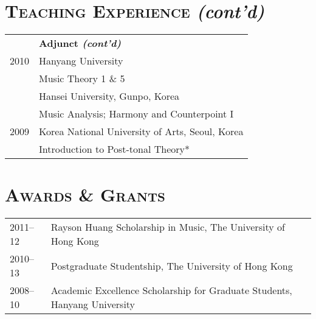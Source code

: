 \documentclass[letter,11pt,draft]{article}
\begin{document}
  \section*{\textsc{Teaching Experience} \textit{(cont'd)}}
  \hspace*{-0.25cm}
  \begin{tabular}{p{2.5cm} l}
    & \textbf{Adjunct \textit{(cont'd)}}\\
    2010 & Hanyang University\\
    & Music Theory 1 \& 5\\[1mm]
    
    & Hansei University, Gunpo, Korea\\
    & Music Analysis; Harmony and Counterpoint I\\[1mm]
    
    2009 & Korea National University of Arts, Seoul, Korea\\
    & Introduction to Post-tonal Theory*
  \end{tabular}
  
  \vspace{5mm}
  
%  
%  
  
  \section*{\textsc{Awards \& Grants}}
  
  \hspace*{-0.25cm}
  \begin{tabular}{p{2.5cm} l}
    
    2011–12 & Rayson Huang Scholarship in Music, The University of Hong Kong\\
    
    2010–13 & Postgraduate Studentship, The University of Hong Kong\\
    
    2008–10 & Academic Excellence Scholarship for Graduate Students, Hanyang
    University
  \end{tabular}
  
\end{document}
